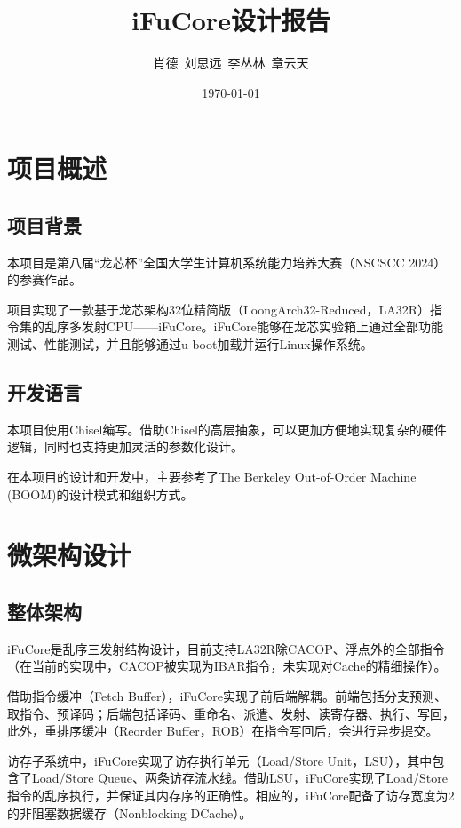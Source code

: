 \documentclass{article}
\title{iFuCore设计报告}
\author{肖德\ 刘思远\ 李丛林\ 章云天}
\date{\today}
\begin{document}
\maketitle

\section{项目概述}
\subsection{项目背景}
本项目是第八届“龙芯杯”全国大学生计算机系统能力培养大赛（NSCSCC 2024）的参赛作品。\par
项目实现了一款基于龙芯架构32位精简版（LoongArch32-Reduced，LA32R）指令集的乱序多发射CPU——iFuCore。iFuCore能够在龙芯实验箱上通过全部功能测试、性能测试，并且能够通过u-boot加载并运行Linux操作系统。\par

\subsection{开发语言}
本项目使用Chisel编写。借助Chisel的高层抽象，可以更加方便地实现复杂的硬件逻辑，同时也支持更加灵活的参数化设计。\par
在本项目的设计和开发中，主要参考了The Berkeley Out-of-Order Machine (BOOM)的设计模式和组织方式。\par

\section{微架构设计}
\subsection{整体架构}
iFuCore是乱序三发射结构设计，目前支持LA32R除CACOP、浮点外的全部指令（在当前的实现中，CACOP被实现为IBAR指令，未实现对Cache的精细操作）。\par
借助指令缓冲（Fetch Buffer），iFuCore实现了前后端解耦。前端包括分支预测、取指令、预译码；后端包括译码、重命名、派遣、发射、读寄存器、执行、写回，此外，重排序缓冲（Reorder Buffer，ROB）在指令写回后，会进行异步提交。\par
访存子系统中，iFuCore实现了访存执行单元（Load/Store Unit，LSU），其中包含了Load/Store Queue、两条访存流水线。借助LSU，iFuCore实现了Load/Store指令的乱序执行，并保证其内存序的正确性。相应的，iFuCore配备了访存宽度为2的非阻塞数据缓存（Nonblocking DCache）。\par
\end{document}
